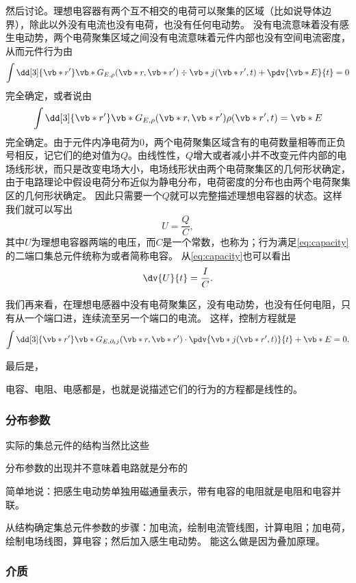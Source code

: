然后讨论。理想电容器有两个互不相交的电荷可以聚集的区域（比如说导体边界），除此以外没有电流也没有电荷，也没有任何电动势。
没有电流意味着没有感生电动势，两个电荷聚集区域之间没有电流意味着元件内部也没有空间电流密度，从而元件行为由
\[
    \int \dd[3]{\vb*{r}'} \vb*{G}_{E, \rho}(\vb*{r}, \vb*{r}') \div{\vb*{j}}(\vb*{r}', t) + \pdv{\vb*{E}}{t} = 0
\]
完全确定，或者说由
\[
    \int \dd[3]{\vb*{r}'} \vb*{G}_{E, \rho}(\vb*{r}, \vb*{r}') \rho(\vb*{r}', t) = \vb*{E}
\]
完全确定。由于元件内净电荷为0，两个电荷聚集区域含有的电荷数量相等而正负号相反，记它们的绝对值为$Q$。由线性性，$Q$增大或者减小并不改变元件内部的电场线形状，而只是改变电场大小，电场线形状由两个电荷聚集区的几何形状确定，由于电路理论中假设电荷分布近似为静电分布，电荷密度的分布也由两个电荷聚集区的几何形状确定。
因此只需要一个$Q$就可以完整描述理想电容器的状态。这样我们就可以写出
\begin{equation}
    U = \frac{Q}{C},
    \label{eq:capacity}
\end{equation}
其中$U$为理想电容器两端的电压，而$C$是一个常数，也称为；行为满足\eqref{eq:capacity}的二端口集总元件统称为或者简称电容。
从\eqref{eq:capacity}也可以看出
\[
    \dv{U}{t} = \frac{I}{C}.
\]

我们再来看，在理想电感器中没有电荷聚集区，没有电动势，也没有任何电阻，只有从一个端口进，连续流至另一个端口的电流。
这样，控制方程就是
\[
    \int \dd[3]{\vb*{r}'} \vb*{G}_{E, \partial_t j}(\vb*{r}, \vb*{r}') \cdot \pdv{\vb*{j}(\vb*{r}', t)}{t} + \vb*{E} = 0.
\]

最后是，

电容、电阻、电感都是，也就是说描述它们的行为的方程都是线性的。

\subsubsection{分布参数}

实际的集总元件的结构当然比这些

分布参数的出现并不意味着电路就是分布的

简单地说：把感生电动势单独用磁通量表示，带有电容的电阻就是电阻和电容并联。

从结构确定集总元件参数的步骤：加电流，绘制电流管线图，计算电阻；加电荷，绘制电场线图，算电容；然后加入感生电动势。
能这么做是因为叠加原理。

\subsubsection{介质}

